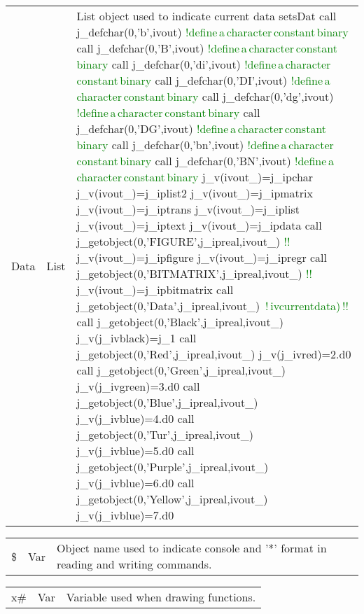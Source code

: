 \vspace{-1.51em}
\begin{table}[H]
 \begin{tabular}{ m{}  m{} p{}}
Data &List&  List object used to indicate current data setsDat
call j\_defchar(0,'b',ivout) \textcolor{green}{!define\,a\,character\,constant\,binary}
call j\_defchar(0,'B',ivout) \textcolor{green}{!define\,a\,character\,constant\,binary}
call j\_defchar(0,'di',ivout) \textcolor{green}{!define\,a\,character\,constant\,binary}
call j\_defchar(0,'DI',ivout) \textcolor{green}{!define\,a\,character\,constant\,binary}
call j\_defchar(0,'dg',ivout) \textcolor{green}{!define\,a\,character\,constant\,binary}
call j\_defchar(0,'DG',ivout) \textcolor{green}{!define\,a\,character\,constant\,binary}
call j\_defchar(0,'bn',ivout) \textcolor{green}{!define\,a\,character\,constant\,binary}
call j\_defchar(0,'BN',ivout) \textcolor{green}{!define\,a\,character\,constant\,binary}
j\_v(ivout\_)=j\_ipchar
j\_v(ivout\_)=j\_iplist2
j\_v(ivout\_)=j\_ipmatrix
j\_v(ivout\_)=j\_iptrans
j\_v(ivout\_)=j\_iplist
j\_v(ivout\_)=j\_iptext
j\_v(ivout\_)=j\_ipdata
call j\_getobject(0,'FIGURE',j\_ipreal,ivout\_) \textcolor{green}{!!}
j\_v(ivout\_)=j\_ipfigure
j\_v(ivout\_)=j\_ipregr
call j\_getobject(0,'BITMATRIX',j\_ipreal,ivout\_) \textcolor{green}{!!}
j\_v(ivout\_)=j\_ipbitmatrix
call j\_getobject(0,'Data',j\_ipreal,ivout\_) \,\textcolor{green}{!\,ivcurrentdata)\,!!}
call j\_getobject(0,'Black',j\_ipreal,ivout\_)
j\_v(j\_ivblack)=j\_1
call j\_getobject(0,'Red',j\_ipreal,ivout\_)
j\_v(j\_ivred)=2.d0
call j\_getobject(0,'Green',j\_ipreal,ivout\_)
j\_v(j\_ivgreen)=3.d0
call j\_getobject(0,'Blue',j\_ipreal,ivout\_)
j\_v(j\_ivblue)=4.d0
call j\_getobject(0,'Tur',j\_ipreal,ivout\_)
j\_v(j\_ivblue)=5.d0
call j\_getobject(0,'Purple',j\_ipreal,ivout\_)
j\_v(j\_ivblue)=6.d0
call j\_getobject(0,'Yellow',j\_ipreal,ivout\_)
j\_v(j\_ivblue)=7.d0
\end{tabular}
\end{table}
\vspace{-1.51em}
\begin{table}[H]
 \begin{tabular}{ m{}  m{} p{}}
 \$&Var& Object name used to indicate console and '*' format in reading and writing
 commands.
\end{tabular}
\end{table}
\vspace{-1.51em}
\begin{table}[H]
 \begin{tabular}{ m{}  m{} p{}}
x\#&Var& Variable used when drawing functions.
\end{tabular}
\end{table}
